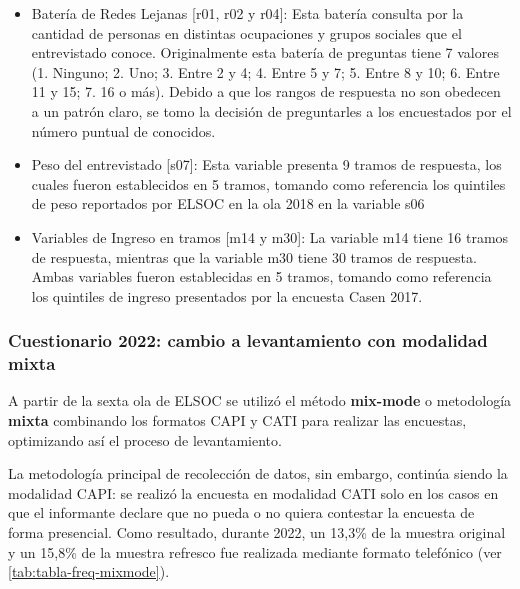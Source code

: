 \documentclass[
  12pt,
]{article}
\begin{document}
\begin{itemize}
\item
  Batería de Redes Lejanas {[}r01, r02 y r04{]}: Esta batería consulta por la cantidad de personas en distintas ocupaciones y grupos sociales que el entrevistado conoce. Originalmente esta batería de preguntas tiene 7 valores (1. Ninguno; 2. Uno; 3. Entre 2 y 4; 4. Entre 5 y 7; 5. Entre 8 y 10; 6. Entre 11 y 15; 7. 16 o más). Debido a que los rangos de respuesta no son obedecen a un patrón claro, se tomo la decisión de preguntarles a los encuestados por el número puntual de conocidos.
\item
  Peso del entrevistado {[}s07{]}: Esta variable presenta 9 tramos de respuesta, los cuales fueron establecidos en 5 tramos, tomando como referencia los quintiles de peso reportados por ELSOC en la ola 2018 en la variable s06
\item
  Variables de Ingreso en tramos {[}m14 y m30{]}: La variable m14 tiene 16 tramos de respuesta, mientras que la variable m30 tiene 30 tramos de respuesta. Ambas variables fueron establecidas en 5 tramos, tomando como referencia los quintiles de ingreso presentados por la encuesta Casen 2017.
\end{itemize}

\hypertarget{instrumento-mixmode}{%
\subsubsection*{Cuestionario 2022: cambio a levantamiento con modalidad mixta}\label{instrumento-mixmode}}

A partir de la sexta ola de ELSOC se utilizó el método \textbf{mix-mode} o metodología \textbf{mixta} combinando los formatos CAPI y CATI para realizar las encuestas, optimizando así el proceso de levantamiento.

La metodología principal de recolección de datos, sin embargo, continúa siendo la modalidad CAPI: se realizó la encuesta en modalidad CATI solo en los casos en que el informante declare que no pueda o no quiera contestar la encuesta de forma presencial. Como resultado, durante 2022, un 13,3\% de la muestra original y un 15,8\% de la muestra refresco fue realizada mediante formato telefónico (ver \ref{tab:tabla-freq-mixmode}).
\end{document}
